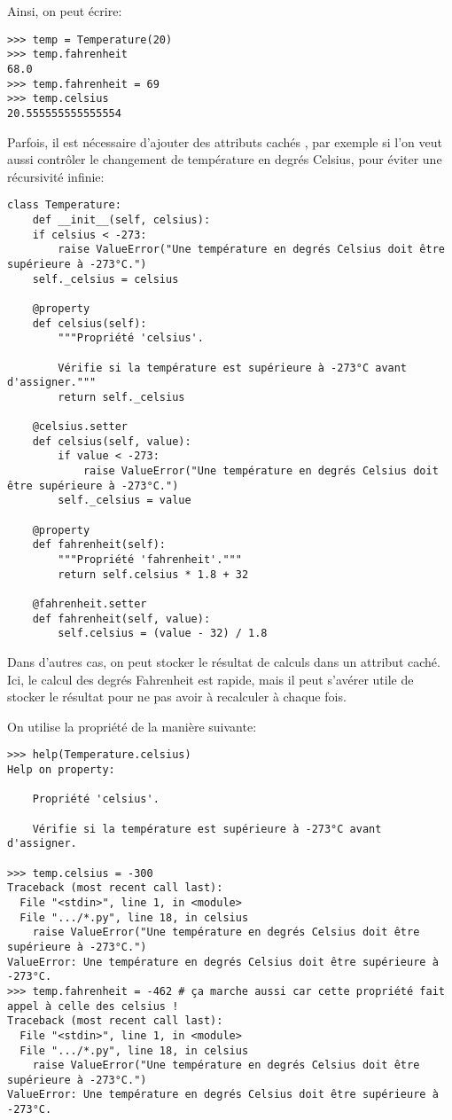 Ainsi, on peut écrire:
\begin{verbatim}
>>> temp = Temperature(20)
>>> temp.fahrenheit
68.0
>>> temp.fahrenheit = 69
>>> temp.celsius
20.555555555555554
\end{verbatim}

Parfois, il est nécessaire d'ajouter des attributs \og cachés \fg{}, par exemple si l'on veut aussi contrôler le changement de 
température en degrés Celsius, pour éviter une récursivité infinie:

\begin{verbatim}
class Temperature:
    def __init__(self, celsius):
    if celsius < -273:
        raise ValueError("Une température en degrés Celsius doit être supérieure à -273°C.")
    self._celsius = celsius
    
    @property
    def celsius(self):
        """Propriété 'celsius'.
        
        Vérifie si la température est supérieure à -273°C avant d'assigner."""
        return self._celsius

    @celsius.setter
    def celsius(self, value):
        if value < -273:
            raise ValueError("Une température en degrés Celsius doit être supérieure à -273°C.")
        self._celsius = value
            
    @property
    def fahrenheit(self):
        """Propriété 'fahrenheit'."""
        return self.celsius * 1.8 + 32

    @fahrenheit.setter
    def fahrenheit(self, value):
        self.celsius = (value - 32) / 1.8
\end{verbatim}

Dans d'autres cas, on peut stocker le résultat de calculs dans un attribut caché. Ici, le calcul des degrés Fahrenheit est
rapide, mais il peut s'avérer utile de stocker le résultat pour ne pas avoir à recalculer à chaque fois.\medskip

On utilise la propriété de la manière suivante:
\begin{verbatim}
>>> help(Temperature.celsius)
Help on property:

    Propriété 'celsius'.
    
    Vérifie si la température est supérieure à -273°C avant d'assigner.
    
>>> temp.celsius = -300
Traceback (most recent call last):
  File "<stdin>", line 1, in <module>
  File ".../*.py", line 18, in celsius
    raise ValueError("Une température en degrés Celsius doit être supérieure à -273°C.")
ValueError: Une température en degrés Celsius doit être supérieure à -273°C.
>>> temp.fahrenheit = -462 # ça marche aussi car cette propriété fait appel à celle des celsius !
Traceback (most recent call last):
  File "<stdin>", line 1, in <module>
  File ".../*.py", line 18, in celsius
    raise ValueError("Une température en degrés Celsius doit être supérieure à -273°C.")
ValueError: Une température en degrés Celsius doit être supérieure à -273°C.
\end{verbatim}

